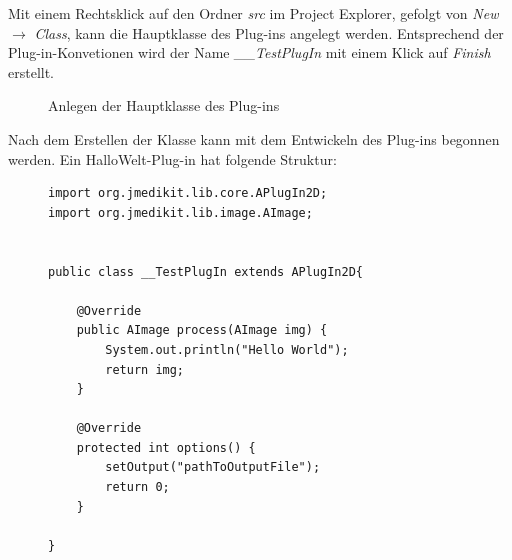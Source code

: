 Mit einem Rechtsklick auf den Ordner \textit{src} im Project Explorer, gefolgt von \textit{New} $\rightarrow$ \textit{Class}, kann die Hauptklasse des Plug-ins angelegt werden. Entsprechend der Plug-in-Konvetionen wird der Name \textit{\_\_TestPlugIn} mit einem Klick auf \textit{Finish} erstellt.

\begin{figure}[H]
  \vspace{0.5cm}
  \centering
  \caption{Anlegen der Hauptklasse des Plug-ins}
  \label{class}
  \vspace{0.5cm}
\end{figure}

Nach dem Erstellen der Klasse kann mit dem Entwickeln des Plug-ins begonnen werden. Ein HalloWelt-Plug-in hat folgende Struktur:

\begin{figure}[htbp]
\begin{lstlisting}[frame=leftline]
import org.jmedikit.lib.core.APlugIn2D;
import org.jmedikit.lib.image.AImage;


public class __TestPlugIn extends APlugIn2D{

	@Override
	public AImage process(AImage img) {
		System.out.println("Hello World");
		return img;
	}

	@Override
	protected int options() {
		setOutput("pathToOutputFile");
		return 0;
	}

}
\end{lstlisting}

\end{figure}